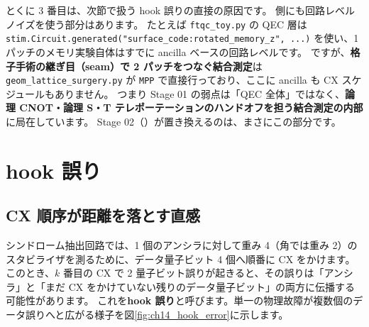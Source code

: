 とくに 3 番目は、次節で扱う hook 誤りの直接の原因です。
 側にも回路レベルノイズを使う部分はあります。
たとえば \texttt{ftqc\_toy.py} の QEC 層は \texttt{stim.Circuit.generated("surface\_code:rotated\_memory\_z", ...)} を使い、1 パッチのメモリ実験自体はすでに ancilla ベースの回路レベルです。
ですが、\textbf{格子手術の継ぎ目（seam）で 2 パッチをつなぐ結合測定}は \texttt{geom\_lattice\_surgery.py} が \texttt{MPP} で直接行っており、ここに ancilla も CX スケジュールもありません。
つまり Stage 01 の弱点は「QEC 全体」ではなく、\textbf{論理 CNOT・論理 S・T テレポーテーションのハンドオフを担う結合測定の内部}に局在しています。
Stage 02（）が置き換えるのは、まさにこの部分です。

\section{hook 誤り}\label{sec:hook}

\subsection{CX 順序が距離を落とす直感}

シンドローム抽出回路では、1 個のアンシラに対して重み 4（角では重み 2）のスタビライザを測るために、データ量子ビット 4 個へ順番に CX をかけます。
このとき、$k$ 番目の CX で 2 量子ビット誤りが起きると、その誤りは「アンシラ」と「まだ CX をかけていない残りのデータ量子ビット」の両方に伝播する可能性があります。
これを\textbf{hook 誤り}と呼びます。単一の物理故障が複数個のデータ誤りへと広がる様子を図\ref{fig:ch14_hook_error}に示します。

